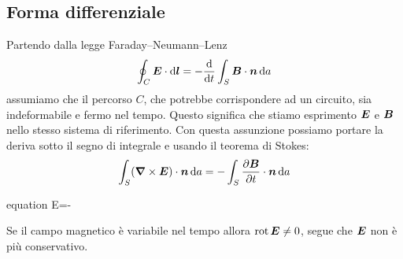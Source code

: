 \subsection{Forma differenziale}
Partendo dalla legge Faraday--Neumann--Lenz
\begin{equation}
  \oint_C\boldsymbol{E}\cdot\mathrm{d} \boldsymbol{l} = -\frac{\mathrm{d}}{\mathrm{d} t}\int_S\boldsymbol{B}\cdot\boldsymbol{n}\,\mathrm{d} a
\end{equation}
assumiamo che il percorso $C$, che potrebbe corrispondere ad un circuito, sia indeformabile e fermo nel tempo. Questo significa che stiamo esprimento $\boldsymbol{E}$ e $\boldsymbol{B}$ nello stesso sistema di riferimento. Con questa assunzione possiamo portare la deriva sotto il segno di integrale e usando il teorema di Stokes:
\begin{equation}
  \int_S(\boldsymbol{\nabla}\times\boldsymbol{E})\cdot\boldsymbol{n}\,\mathrm{d} a = -\int_S\frac{\partial\boldsymbol{B}}{\partial t}\cdot\boldsymbol{n}\,\mathrm{d} a
\end{equation}
\begin{eqimp}{equation}
  \ve\nabla\times\ve E=-
\end{eqimp}
Se il campo magnetico è variabile nel tempo allora $\operatorname{rot}\boldsymbol{E}\neq 0$, segue che $\boldsymbol{E}$ non è più conservativo.

